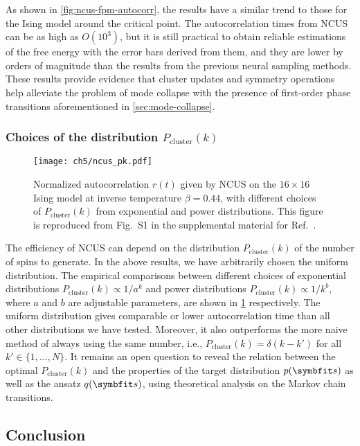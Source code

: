 As shown in \cref{fig:ncus-fpm-autocorr}, the results have a similar trend to those for the Ising model around the critical point. The autocorrelation times from NCUS can be as high as $O(10^3)$, but it is still practical to obtain reliable estimations of the free energy with the error bars derived from them, and they are lower by orders of magnitude than the results from the previous neural sampling methods. These results provide evidence that cluster updates and symmetry operations help alleviate the problem of mode collapse with the presence of first-order phase transitions aforementioned in \cref{sec:mode-collapse}.

\subsubsection{Choices of the distribution $P_\text{cluster}(k)$}

\begin{figure}[htb]
\centering
\texttt{[image: ch5/ncus\_pk.pdf]}
\caption[Choices of the distribution $P_\text{cluster}(k)$ in NCUS]{
Normalized autocorrelation $r(t)$ given by NCUS on the $16 \times 16$ Ising model at inverse temperature $\beta = 0.44$, with different choices of $P_\text{cluster}(k)$ from exponential and power distributions.
This figure is reproduced from Fig.~S1 in the supplemental material for Ref.~\cite{wu2021unbiased}.
}
\label{fig:ncus-pk}
\end{figure}

The efficiency of NCUS can depend on the distribution $P_\text{cluster}(k)$ of the number of spins to generate. In the above results, we have arbitrarily chosen the uniform distribution. The empirical comparisons between different choices of exponential distributions $P_\text{cluster}(k) \propto 1 / a^k$ and power distributions $P_\text{cluster}(k) \propto 1 / k^b$, where $a$ and $b$ are adjustable parameters, are shown in \cref{fig:ncus-pk} respectively. The uniform distribution gives comparable or lower autocorrelation time than all other distributions we have tested. Moreover, it also outperforms the more naive method of always using the same number, i.e., $P_\text{cluster}(k) = \delta(k - k')$ for all $k' \in \{1, \ldots, N\}$. It remains an open question to reveal the relation between the optimal $P_\text{cluster}(k)$ and the properties of the target distribution $p(\vs)$ as well as the ansatz $q(\vs)$, using theoretical analysis on the Markov chain transitions.

\subsection{Conclusion}

